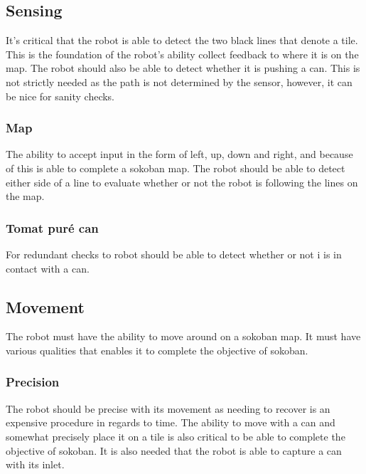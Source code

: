 \documentclass[../../main.tex]{subfiles}
\begin{document}
\subsection{Sensing}%
\label{sub:sensing}

It's critical that the robot is able to detect the two black lines that denote a tile. This is the foundation of the robot's ability collect feedback to where it is on the map.
The robot should also be able to detect whether it is pushing a can. This is not strictly needed as the path is not determined by the sensor, however, it can be nice for sanity checks.

\subsubsection{Map}%
\label{ssub:map}

The ability to accept input in the form of left, up, down and right, and because of this is able to complete a sokoban map.
The robot should be able to detect either side of a line to evaluate whether or not the robot is following the lines on the map.

\subsubsection{Tomat puré can}%
\label{ssub:tomat_pure_can}

For redundant checks to robot should be able to detect whether or not i is in contact with a can.

\subsection{Movement}%
\label{sub:movement}

The robot must have the ability to move around on a sokoban map. It must have various qualities that enables it to complete the objective of sokoban.

\subsubsection{Precision}%
\label{ssub:precision}

The robot should be precise with its movement as needing to recover is an expensive procedure in regards to time.
The ability to move with a can and somewhat precisely place it on a tile is also critical to be able to complete the objective of sokoban. It is also needed that the robot is able to capture a can with its inlet.
\end{document}
